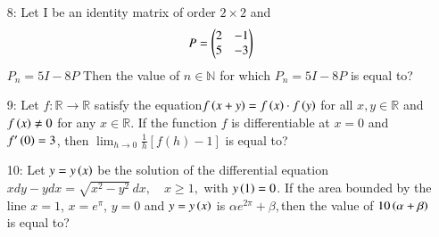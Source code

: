 \documentclass[journal,12pt,twocolumn]{IEEEtran}
\theoremstyle{remark}
\begin{document}
\begin{enumerate}
\item[8:] Let I be an identity matrix of order $2 \times 2$ and $$P = \begin{pmatrix}2&-1\\5&-3\end{pmatrix}$$ $P_n = 5I - 8P$ Then the value of $n \in \mathbb{N}$ for which $P_n = 5I - 8P$ is equal to?\vspace{1mm}\\
\item[9:] Let $f : \mathbb{R} \to \mathbb{R}$ satisfy the equation$f\left(x + y\right) = f\left(x\right) \cdot f\left(y\right)$ for all $x, y \in \mathbb{R}$ and $f\left(x\right) \neq 0$ for any $x \in \mathbb{R}$. If the function $f$ is differentiable at $x = 0$ and $f'\left(0\right) = 3$, then $\lim_{h \to 0} \frac{1}{h} [f(h) - 1] $
is equal to?\vspace{1mm}\\
\item[10:] Let $y = y\left(x\right)$ be the solution of the differential equation 
$x dy - y dx = \sqrt{x^2 - y^2} \, dx, \quad x \geq 1,$ with $y\left(1\right) = 0$. If the area bounded by the line $x = 1$, $x = e^\pi$, $y = 0$ and $y = y\left(x\right)$ is $\alpha e^{2\pi} + \beta, $then the value of $10 \left(\alpha + \beta\right)$ is equal to?
\end{enumerate}
\end{document}

